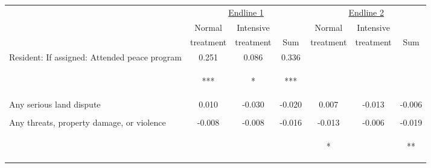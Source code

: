 \begin{tabular}{lcccccc}
\hline \noalign{\smallskip} & \multicolumn{3}{c}{\uline{\hfill Endline 1 \hfill}} & \multicolumn{3}{c}{\uline{\hfill Endline 2 \hfill}}\\
 & Normal & Intensive &  & Normal & Intensive & \\
 & treatment & treatment & Sum & treatment & treatment & Sum\\
\noalign{\smallskip}\hline \noalign{\smallskip}Resident: If assigned: Attended peace program & 0.251 & 0.086 & 0.336 &  &  & \\
 & \begin{footnotesize}[0.023]***\end{footnotesize} & \begin{footnotesize}[0.045]*\end{footnotesize} & \begin{footnotesize}[0.040]***\end{footnotesize} & \begin{footnotesize}\end{footnotesize} & \begin{footnotesize}\end{footnotesize} & \begin{footnotesize}\end{footnotesize}\\
\noalign{\smallskip}Any serious land dispute & 0.010 & -0.030 & -0.020 & 0.007 & -0.013 & -0.006\\
 & \begin{footnotesize}[0.018]\end{footnotesize} & \begin{footnotesize}[0.030]\end{footnotesize} & \begin{footnotesize}[0.028]\end{footnotesize} & \begin{footnotesize}[0.012]\end{footnotesize} & \begin{footnotesize}[0.016]\end{footnotesize} & \begin{footnotesize}[0.014]\end{footnotesize}\\
\noalign{\smallskip}Any threats, property damage, or violence & -0.008 & -0.008 & -0.016 & -0.013 & -0.006 & -0.019\\
 & \begin{footnotesize}[0.013]\end{footnotesize} & \begin{footnotesize}[0.021]\end{footnotesize} & \begin{footnotesize}[0.019]\end{footnotesize} & \begin{footnotesize}[0.007]*\end{footnotesize} & \begin{footnotesize}[0.009]\end{footnotesize} & \begin{footnotesize}[0.007]**\end{footnotesize}\\

\end{tabular}

